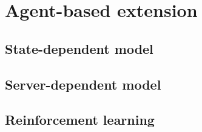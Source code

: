 \section{Agent-based extension}
\subsection{State-dependent model}
\subsection{Server-dependent model}
\subsection{Reinforcement learning}
